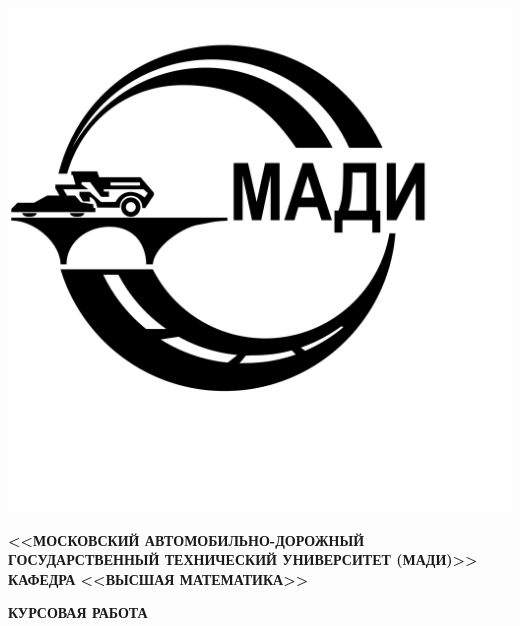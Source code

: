 \documentclass[12pt]{article}
\begin{document}
\begin{titlepage}
    \thispagestyle{empty}
   \begin{center}
        \noindent\begin{minipage}{0.14\textwidth}
        \includegraphics[width=\linewidth]{madi_logo.png}
        \end{minipage}%
        \begin{minipage}{0.86\textwidth}
        \center{\small{\vspace{\baselineskip}}}
        \end{minipage}
        \small{\textbf{<<МОСКОВСКИЙ АВТОМОБИЛЬНО-ДОРОЖНЫЙ ГОСУДАРСТВЕННЫЙ ТЕХНИЧЕСКИЙ УНИВЕРСИТЕТ (МАДИ)>>}}\\
        \vspace{0.2 cm}
        \scriptsize{{\textbf{КАФЕДРА <<ВЫСШАЯ МАТЕМАТИКА>> }}}
        \vspace{\baselineskip}
            
        \small{\textbf{КУРСОВАЯ РАБОТА}}\\
        \vspace{0.2 cm}
        

\end{center}
\end{titlepage}
\end{document}
